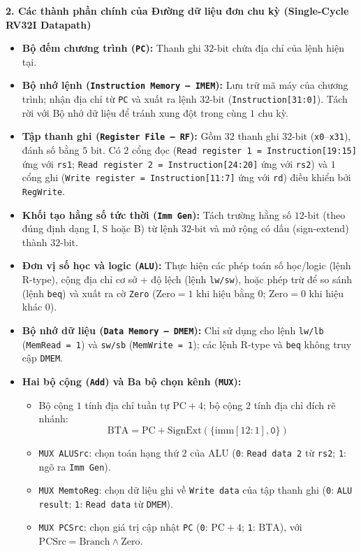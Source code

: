 \textbf{2. Các thành phần chính của Đường dữ liệu đơn chu kỳ (Single-Cycle RV32I Datapath)}
\begin{itemize}
    \item \textbf{Bộ đếm chương trình (\texttt{PC}):} Thanh ghi $32\text{-bit}$ chứa địa chỉ của lệnh hiện tại.
    \item \textbf{Bộ nhớ lệnh (\texttt{Instruction Memory -- IMEM}):} Lưu trữ mã máy của chương trình; nhận địa chỉ từ \texttt{PC} và xuất ra lệnh $32\text{-bit}$ (\texttt{Instruction[31:0]}). Tách rời với Bộ nhớ dữ liệu để tránh xung đột trong cùng $1$ chu kỳ.
    \item \textbf{Tập thanh ghi (\texttt{Register File -- RF}):} Gồm $32$ thanh ghi $32\text{-bit}$ (\texttt{x0}--\texttt{x31}), đánh số bằng $5\text{ bit}$. Có $2$ cổng đọc (\texttt{Read register 1 = Instruction[19:15]} ứng với \texttt{rs1}; \texttt{Read register 2 = Instruction[24:20]} ứng với \texttt{rs2}) và $1$ cổng ghi (\texttt{Write register = Instruction[11:7]} ứng với \texttt{rd}) điều khiển bởi \texttt{RegWrite}.
    \item \textbf{Khối tạo hằng số tức thời (\texttt{Imm Gen}):} Tách trường hằng số $12\text{-bit}$ (theo đúng định dạng I, S hoặc B) từ lệnh $32\text{-bit}$ và mở rộng có dấu (sign-extend) thành $32\text{-bit}$.
    \item \textbf{Đơn vị số học và logic (\texttt{ALU}):} Thực hiện các phép toán số học/logic (lệnh R-type), cộng địa chỉ cơ sở + độ lệch (lệnh \texttt{lw/sw}), hoặc phép trừ để so sánh (lệnh \texttt{beq}) và xuất ra cờ \texttt{Zero} ($\text{Zero} = 1$ khi hiệu bằng $0$; $\text{Zero} = 0$ khi hiệu khác $0$).
    \item \textbf{Bộ nhớ dữ liệu (\texttt{Data Memory -- DMEM}):} Chỉ sử dụng cho lệnh \texttt{lw/lb} (\texttt{MemRead = 1}) và \texttt{sw/sb} (\texttt{MemWrite = 1}); các lệnh R-type và \texttt{beq} không truy cập \texttt{DMEM}.
    \item \textbf{Hai bộ cộng (\texttt{Add}) và Ba bộ chọn kênh (\texttt{MUX}):}
    \begin{itemize}
        \item Bộ cộng $1$ tính địa chỉ tuần tự $\text{PC} + 4$; bộ cộng $2$ tính địa chỉ đích rẽ nhánh:
        $$\text{BTA} = \text{PC} + \text{SignExt}(\{\text{imm}[12:1], \texttt{0}\})$$
        \item \texttt{MUX ALUSrc}: chọn toán hạng thứ $2$ của ALU (\texttt{0}: \texttt{Read data 2} từ \texttt{rs2}; \texttt{1}: ngõ ra \texttt{Imm Gen}).
        \item \texttt{MUX MemtoReg}: chọn dữ liệu ghi về \texttt{Write data} của tập thanh ghi (\texttt{0}: \texttt{ALU result}; \texttt{1}: \texttt{Read data} từ \texttt{DMEM}).
        \item \texttt{MUX PCSrc}: chọn giá trị cập nhật \texttt{PC} (\texttt{0}: $\text{PC} + 4$; \texttt{1}: $\text{BTA}$), với $\text{PCSrc} = \text{Branch} \land \text{Zero}$.
    \end{itemize}
\end{itemize}

